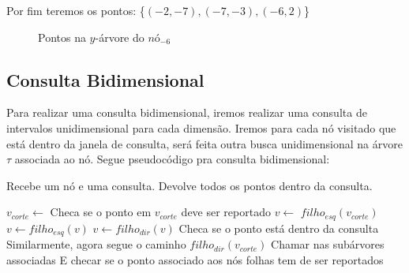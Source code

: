 Por fim teremos os pontos: \{$(-2,-7), (-7,-3), (-6,2)$\}
\begin{figure}[h]
\centering
{}
\caption{Pontos na $y$-árvore do $nó_{-6}$}
\end{figure}

\subsection{Consulta Bidimensional}

Para realizar uma consulta bidimensional, iremos realizar uma consulta de intervalos unidimensional para
cada dimensão. 
Iremos para cada nó visitado que está dentro da janela de consulta, será feita outra busca unidimensional
na árvore $\tau$ associada ao nó.
Segue pseudocódigo pra consulta bidimensional:

\begin{algorithm}[h!]
    \caption{Recebe um nó e uma consulta. Devolve todos os pontos dentro da consulta.}
    \begin{algorithmic}[1]
        \State $v_{corte} \leftarrow$ 
            \State Checa se o ponto em $v_{corte}$ deve ser reportado
        \Else
            \State $v \leftarrow $ $filho_{esq}(v_{corte})$
                    \State {}
                    \State $v \leftarrow filho_{esq}(v)$
                \Else
                    \State $v \leftarrow filho_{dir}(v)$
                \EndIf
            \EndWhile
            \State Checa se o ponto está dentro da consulta
            \State Similarmente, agora segue o caminho $filho_{dir}(v_{corte})$
            \State Chamar  nas subárvores associadas
            \State E checar se o ponto associado aos nós folhas tem de ser reportados
        \EndIf
    \EndFunction
    \end{algorithmic}
\end{algorithm}
\clearpage


